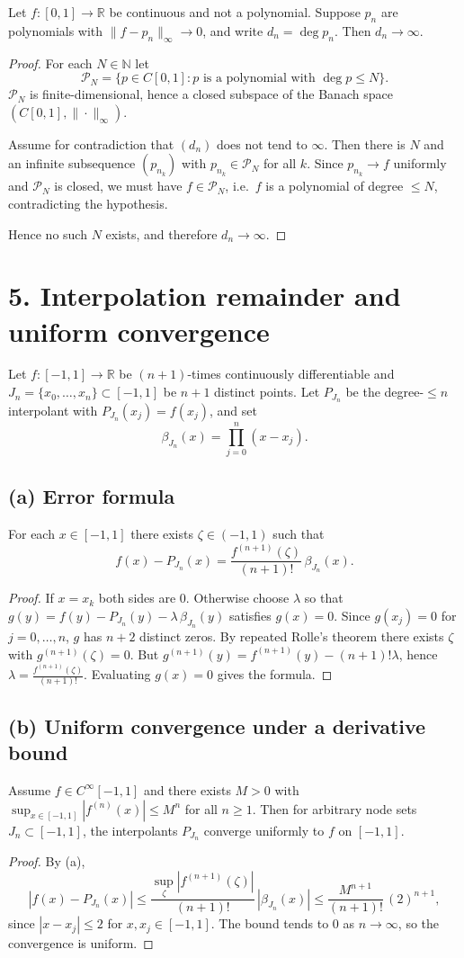 \documentclass[11pt,a4paper]{article}
\theoremstyle{definition}
\theoremstyle{definition}
\theoremstyle{plain}
\theoremstyle{remark}
\begin{document}
Let $f:[0,1]\to\mathbb{R}$ be continuous and not a polynomial. Suppose $p_n$ are polynomials with
$\|f-p_n\|_\infty\to0$, and write $d_n=\deg p_n$. Then $d_n\to\infty$.

\begin{proof}
	For each $N\in\mathbb{N}$ let
	\[
	\mathcal P_N=\{p\in C[0,1]: p \text{ is a polynomial with } \deg p\le N\}.
	\]
	$\mathcal P_N$ is finite-dimensional, hence a closed subspace of the Banach space $(C[0,1],\|\cdot\|_\infty)$.
	
	Assume for contradiction that $(d_n)$ does not tend to $\infty$. Then there is $N$ and an infinite subsequence $(p_{n_k})$ with $p_{n_k}\in\mathcal P_N$ for all $k$. Since $p_{n_k}\to f$ uniformly and $\mathcal P_N$ is closed, we must have $f\in\mathcal P_N$, i.e.\ $f$ is a polynomial of degree $\le N$, contradicting the hypothesis.
	
	Hence no such $N$ exists, and therefore $d_n\to\infty$.
\end{proof}

\section*{5. Interpolation remainder and uniform convergence}

Let $f:[-1,1]\to\mathbb R$ be $(n\!+\!1)$-times continuously differentiable and
$J_n=\{x_0,\dots,x_n\}\subset[-1,1]$ be $n\!+\!1$ distinct points. Let $P_{J_n}$
be the degree-$\le n$ interpolant with $P_{J_n}(x_j)=f(x_j)$, and set
\[
\beta_{J_n}(x)=\prod_{j=0}^{n}(x-x_j).
\]

\subsection*{(a) Error formula}
For each $x\in[-1,1]$ there exists $\zeta\in(-1,1)$ such that
\[
f(x)-P_{J_n}(x)=\frac{f^{(n+1)}(\zeta)}{(n+1)!}\,\beta_{J_n}(x).
\]
\begin{proof}
	If $x=x_k$ both sides are $0$. Otherwise choose $\lambda$ so that
	$g(y)=f(y)-P_{J_n}(y)-\lambda\,\beta_{J_n}(y)$ satisfies $g(x)=0$.
	Since $g(x_j)=0$ for $j=0,\dots,n$, $g$ has $n\!+\!2$ distinct zeros.
	By repeated Rolle's theorem there exists $\zeta$ with
	$g^{(n+1)}(\zeta)=0$. But
	$g^{(n+1)}(y)=f^{(n+1)}(y)-(n+1)!\lambda$, hence
	$\lambda=\frac{f^{(n+1)}(\zeta)}{(n+1)!}$. Evaluating $g(x)=0$ gives the formula.
\end{proof}

\subsection*{(b) Uniform convergence under a derivative bound}
Assume $f\in C^\infty[-1,1]$ and there exists $M>0$ with
$\sup_{x\in[-1,1]}|f^{(n)}(x)|\le M^n$ for all $n\ge1$.
Then for arbitrary node sets $J_n\subset[-1,1]$,
the interpolants $P_{J_n}$ converge uniformly to $f$ on $[-1,1]$.
\begin{proof}
	By (a),
	\[
	|f(x)-P_{J_n}(x)|\le \frac{\sup_\zeta |f^{(n+1)}(\zeta)|}{(n+1)!}\,|\beta_{J_n}(x)|
	\le \frac{M^{n+1}}{(n+1)!}\,(2)^{n+1},
	\]
	since $|x-x_j|\le 2$ for $x,x_j\in[-1,1]$. The bound tends to $0$ as $n\to\infty$,
	so the convergence is uniform.
\end{proof}
\end{document}
